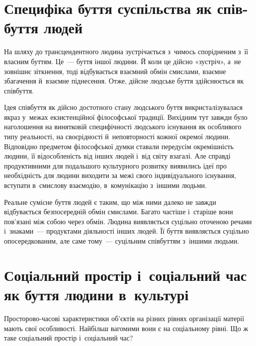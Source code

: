 \documentclass[a5paper,oneside,DIV=12,12pt,headings=small]{scrartcl}
\begin{document}
	\section{Специфіка буття суспільства як спів-буття людей}
		На шляху до трансцендентного людина зустрічається з~чимось спорідненим з~її власним буттям. Це~— буття іншої людини. Й коли це дійсно «зустріч», а~не зовнішнє зіткнення, тоді відбувається взаємний обмін смислами, взаємне збагачення й~взаємне піднесення. Отже, дійсне людське буття здійснюється як співбуття.
		
		Ідея співбуття як дійсно достотного стану людського буття викристалізувалася якраз у~межах екзистенційної філософської традиції. Вихідним тут завжди було наголошення на винятковій специфічності людського існування як особливого типу реальності, на своєрідності й~неповторності кожної окремої людини. Відповідно предметом філософської думки ставали передусім окремішність людини, її відособленість від інших людей і~від світу взагалі. Але справді продуктивними для подальшого культурного розвитку виявились ідеї про необхідність для людини виходити за межі свого індивідуального існування, вступати в~смислову взаємодію, в~комунікацію з~іншими людьми.
		
		Реальне сумісне буття людей є таким, що між ними далеко не завжди відбувається безпосередній обмін смислами. Багато частіше і~старіше вони пов'язані між собою через обмін. Людина виявляється суцільно оточеною речами і~знаками~— продуктами діяльності інших людей. Її буття виявляється суцільно опосередкованим, але саме тому~— суцільним співбуттям з~іншими людьми.
		 
	\section{Соціальний простір і~соціальний час як буття людини в~культурі}
		Просторово-часові характеристики об'\-єктів на різних рівнях організації матерії мають свої особливості. Найбільш вагомими вони є на соціальному рівні. Що ж таке соціальний простір і~соціальний час?
\end{document}
